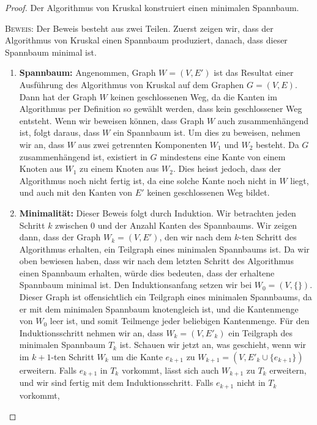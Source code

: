 \documentclass[12pt,a4paper]{report}
\theoremstyle{break}
\theoremstyle{plain}
\newtheorem{proof}{Satz}[chapter]
\begin{document}
\begin{proof}\label{kruskproof}Der Algorithmus von Kruskal konstruiert
  einen minimalen Spannbaum.

 \bigskip\noindent\textsc{Beweis:} Der Beweis besteht aus zwei Teilen. Zuerst zeigen wir, dass der Algorithmus von Kruskal einen Spannbaum produziert, danach, dass dieser Spannbaum minimal ist.
 
 \begin{enumerate}
 \item \textbf{Spannbaum:} Angenommen, Graph $W=(V,E')$ ist das
   Resultat einer Ausf\"{u}hrung des Algorithmus von Kruskal auf dem
   Graphen $G=(V,E)$. Dann hat der Graph $W$ keinen geschlossenen Weg,
   da die Kanten im Algorithmus per Definition so gew\"{a}hlt werden,
   dass kein geschlossener Weg entsteht. Wenn wir beweisen k\"{o}nnen,
   dass Graph $W$ auch zusammenh\"{a}ngend ist, folgt daraus, dass $W$
   ein Spannbaum ist. Um dies zu beweisen, nehmen wir an, dass $W$ aus
   zwei getrennten Komponenten $W_1$ und $W_2$ besteht. Da $G$
   zusammenh\"{a}ngend ist, existiert in $G$ mindestens eine Kante von
   einem Knoten aus $W_1$ zu einem Knoten aus $W_2$. Dies heisst
   jedoch, dass der Algorithmus noch nicht fertig ist, da eine solche
   Kante noch nicht in $W$ liegt, und auch mit den Kanten von $E'$
   keinen geschlossenen Weg bildet.
\item \textbf{Minimalit\"{a}t:} Dieser Beweis folgt durch
  Induktion. Wir betrachten jeden Schritt $k$ zwischen $0$ und der
  Anzahl Kanten des Spannbaums. Wir zeigen dann, dass der Graph $W_k=(V,E')$, den wir nach
  dem $k$-ten Schritt des Algorithmus erhalten, ein Teilgraph eines
  minimalen Spannbaums ist.
  Da wir oben bewiesen haben, dass wir nach dem letzten
  Schritt des Algorithmus einen Spannbaum erhalten, w\"{u}rde dies
  bedeuten, dass der erhaltene Spannbaum minimal ist. Den
  Induktionsanfang setzen wir bei $W_0=(V,\{\})$. Dieser Graph ist
  offensichtlich ein Teilgraph eines minimalen Spannbaums, da er
  mit dem minimalen Spannbaum knotengleich ist, und die Kantenmenge
  von $W_0$ leer ist, und somit Teilmenge jeder beliebigen Kantenmenge. F\"{u}r den
  Induktionsschritt nehmen wir an, dass $W_k=(V,E'_k)$ ein Teilgraph des 
  minimalen Spannbaum $T_k$ ist. Schauen wir jetzt an,
  was geschieht, wenn wir im $k+1$-ten Schritt $W_k$ um die Kante $e_{k+1}$ zu
  $W_{k+1}=(V,E'_k \cup \{e_{k+1}\})$ erweitern. Falls $e_{k+1}$ in $T_k$ vorkommt,
  l\"{a}sst sich auch $W_{k+1}$ zu $T_k$ erweitern, und wir sind
  fertig mit dem Induktionsschritt. Falls $e_{k+1}$ nicht in $T_k$ vorkommt,

\end{enumerate}
\end{proof}
\end{document}
